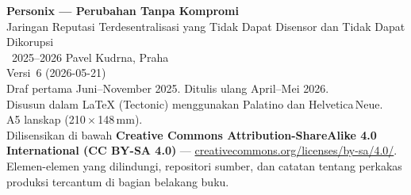 \thispagestyle{empty}
\ifdefined\printmode\vspace*{\fill}\else{}\fi
\begin{flushleft}\small\sffamily
\textbf{Personix --- Perubahan Tanpa Kompromi}\\[0.3em]
Jaringan Reputasi Terdesentralisasi yang Tidak Dapat Disensor dan Tidak Dapat Dikorupsi\\[1.4em]

\textcopyright\ 2025--2026 Pavel Kudrna, Praha\\[0.4em]

Versi~6 (2026-05-21)\\
Draf pertama Juni--November 2025. Ditulis ulang April--Mei 2026.\\[1.4em]

Disusun dalam \LaTeX{} (Tectonic) menggunakan Palatino dan Helvetica\,Neue.\\
A5 lanskap (210\,$\times$\,148\,mm).\\[1.4em]

Dilisensikan di bawah \textbf{Creative Commons Attribution-ShareAlike 4.0
International (CC BY-SA 4.0)} ---
\href{https://creativecommons.org/licenses/by-sa/4.0/}{creativecommons.org/licenses/by-sa/4.0/}.
Elemen-elemen yang dilindungi, repositori sumber, dan catatan tentang perkakas
produksi tercantum di bagian belakang buku.
\end{flushleft}
\ifdefined\printmode\else{}\fi
\clearpage
